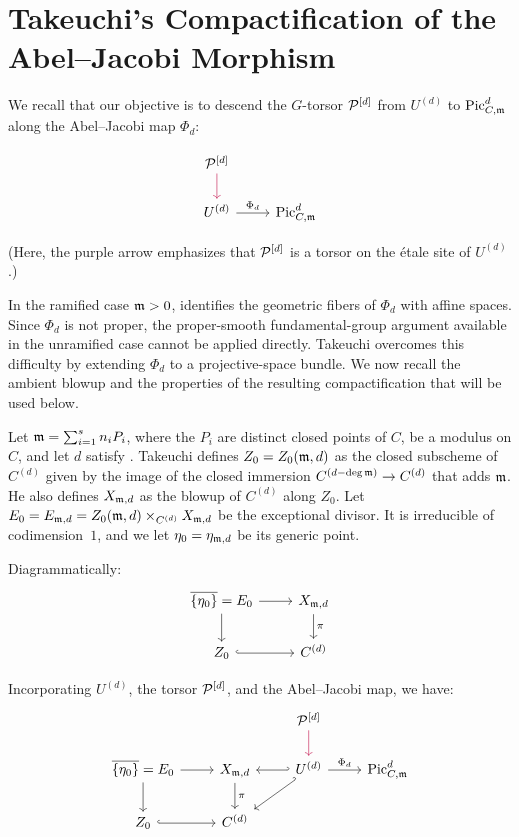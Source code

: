 \section{Takeuchi's Compactification of the Abel--Jacobi Morphism}\label{section:BlowupOfSymmetricPowerOfCurves}
We recall that our objective is to descend the $G$-torsor $\cP^{[d]}$ from
$U^{(d)}$ to $\PicCm[d]$ along the Abel--Jacobi map $\Phi_d$:

\[
\begin{tikzcd}
 \cP^{[d]} \arrow[d, purple]\\
 U^{(d)} \arrow[r, "\Phi_d"] & \PicCm[d]
\end{tikzcd}
\]


(Here, the purple arrow emphasizes that $\cP^{[d]}$ is a torsor on the
\'etale site of $U^{(d)}$.)

In the ramified case $\mdls>0$, 
identifies the geometric fibers of $\Phi_d$ with affine spaces. Since
$\Phi_d$ is not proper, the proper-smooth fundamental-group argument
available in the unramified case cannot be applied directly. Takeuchi
\cite[\S3]{takeuchi2018blow} overcomes this difficulty by extending $\Phi_d$
to a projective-space bundle. We now recall the ambient blowup and the
properties of the resulting compactification that will be used below.

Let $\mdls = \sum_{i=1}^s n_iP_i$, where the $P_i$ are distinct closed
points of $C$, be a modulus on $C$, and let $d$ satisfy
.
Takeuchi \cite[\S3, before (3.6)]{takeuchi2018blow} defines $Z_0=Z_0(\mdls,d)$ as the closed subscheme of
$C^{(d)}$ given by the image of the closed immersion
$C^{(d-\deg\mdls)}\to C^{(d)}$ that adds $\mdls$.
He also defines $X_{\mdls,d}$ as the blowup of $C^{(d)}$ along $Z_0$.
Let $E_0=E_{\mdls,d}=Z_0(\mdls,d)\times_{C^{(d)}}X_{\mdls,d}$ be the
exceptional divisor. It is irreducible of codimension~$1$, and we let
$\eta_0=\eta_{\mdls,d}$ be its generic point.


Diagrammatically:
\[\begin{tikzcd}
\overline{\{\eta_0 \}} =  E_0 \arrow[r] \arrow[d] & X_{\mdls, d} \arrow[d, "\pi"] \\
Z_0 \arrow[r, hook]           & C^{(d)}
\end{tikzcd}\]

Incorporating $U^{(d)}$, the torsor $\cP^{[d]}$, and the Abel--Jacobi map,
we have:
\[
\begin{tikzcd}
    & & \cP^{[d]} \arrow[d, purple]\\
\overline{\{\eta_0 \}} =  E_0 \arrow[r] \arrow[d] &
X_{\mdls, d} \arrow[d, "\pi"]  & \arrow[l, hook'] \arrow[dl, hook'] U^{(d)} \arrow[r, "\Phi_d"] & \PicCm[d] \\
Z_0 \arrow[r, hook]           & C^{(d)}
\end{tikzcd}
\]

